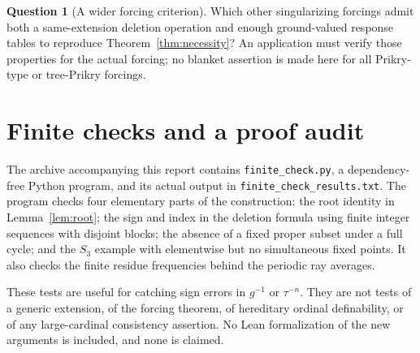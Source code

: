 \documentclass[11pt,letterpaper]{article}
\theoremstyle{definition}
\newtheorem{question}[definition]{Question}
\numberwithin{equation}{section}
\begin{document}
\begin{question}[A wider forcing criterion]
Which other singularizing forcings admit both a same-extension deletion
operation and enough ground-valued response tables to reproduce
Theorem~\ref{thm:necessity}? An application must verify those properties
for the actual forcing; no blanket assertion is made here for all
Prikry-type or tree-Prikry forcings.
\end{question}

\appendix
\section{Finite checks and a proof audit}\label{app:checks}

The archive accompanying this report contains \nolinkurl{finite_check.py},
a dependency-free Python program, and its actual output in
\nolinkurl{finite_check_results.txt}. The program checks four elementary
parts of the construction: the root identity in
Lemma~\ref{lem:root}; the sign and index in the deletion formula using
finite integer sequences with disjoint blocks; the absence of a fixed
proper subset under a full cycle; and the $S_3$ example with elementwise
but no simultaneous fixed points. It also checks the finite residue
frequencies behind the periodic ray averages.

These tests are useful for catching sign errors in $g^{-1}$ or
$\tau^{-n}$. They are not tests of a generic extension, of the forcing
theorem, of hereditary ordinal definability, or of any large-cardinal
consistency assertion. No Lean formalization of the new arguments is
included, and none is claimed.
\end{document}

